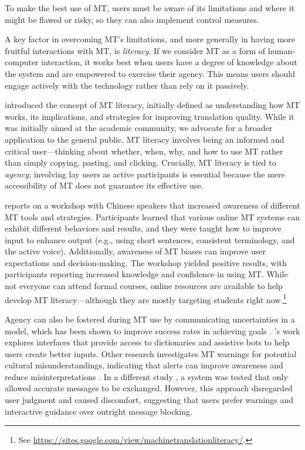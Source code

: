To make the best use of MT, users must be aware of its limitations and where it might be flawed or risky, so they can also implement control measures.

A key factor in overcoming MT’s limitations, and more generally in having more fruitful interactions with MT, is \textit{literacy}. If we consider MT as a form of human-computer interaction, it works best when users have a degree of knowledge about the system and are empowered to exercise their agency. This means users should engage actively with the technology rather than rely on it passively.

\citet{bowker2019towards} introduced the concept of MT literacy, initially defined as understanding how MT works, its implications, and strategies for improving translation quality. While it was initially aimed at the academic community, we advocate for a broader application to the general public. MT literacy involves being an informed and critical user—thinking about whether, when, why, and how to use MT rather than simply copying, pasting, and clicking.
%
Crucially, MT literacy is tied to \textit{agency}; involving lay users as active participants is essential because the mere accessibility of MT does not guarantee its effective use.

\citet{Bowker01092020} reports on a workshop with Chinese speakers that increased awareness of different MT tools and strategies. Participants learned that various online MT systems can exhibit different behaviors and results, and they were taught how to improve input to enhance output (e.g., using short sentences, consistent terminology, and the active voice). Additionally, awareness of MT biases can improve user expectations and decision-making. The workshop yielded positive results, with participants reporting increased knowledge and confidence in using MT. While not everyone can attend formal courses, online resources are available to help develop MT literacy---although they are mostly targeting students right now.\footnote{See \url{https://sites.google.com/view/machinetranslationliteracy/}.}

Agency can also be fostered during MT use by communicating uncertainties in a model, which has been shown to improve success rates in achieving goals \citep{zhao-etal-2024-successfully}. 's work explores interfaces that provide access to dictionaries and assistive bots to help users create better inputs. Other research investigates MT warnings for potential cultural misunderstandings, indicating that alerts can improve awareness and reduce misinterpretations . In a different study , a system was tested that only allowed accurate messages to be exchanged. However, this approach disregarded user judgment and caused discomfort, suggesting that users prefer warnings and interactive guidance over outright message blocking.

